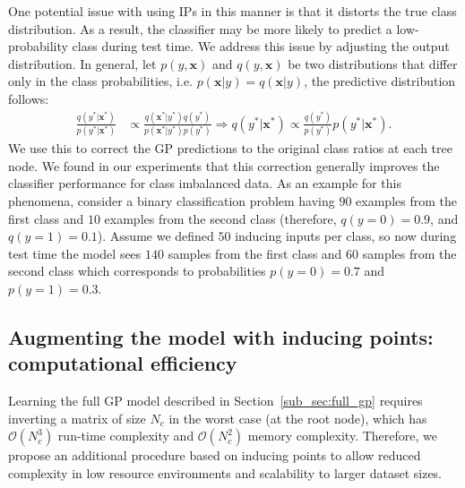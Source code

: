 \documentclass{article}
\def\Secref#1{Section~\ref{#1}}
\def\rvx{{\mathbf{x}}}
\begin{document}
One potential issue with using IPs in this manner is that it distorts the true class distribution. As a result, the classifier may be more likely to predict a low-probability class during test time. 
We address this issue by adjusting the output distribution. In general, let $p( y, \rvx)$ and $q( y, \rvx)$ be two distributions that differ only in the class probabilities, i.e. $p(\rvx|y) = q(\rvx|y)$, the predictive distribution follows:
\begin{equation}\label{eq:fix_class_dist}
    \begin{aligned}
        \frac{q( y^{*} | \rvx^{*})}{p( y^{*} | \rvx^{*})} &\propto \frac{q( \rvx^{*} | y^{*}) q(y^{*})}{p( \rvx^{*} | y^{*}) p(y^{*})} \Longrightarrow
        q( y^{*} | \rvx^{*}) \propto \frac{q(y^{*})}{p(y^{*})}p( y^{*} | \rvx^{*}).
    \end{aligned}
\end{equation}
We use this to correct the GP predictions to the original class ratios at each tree node. We found in our experiments that this correction generally improves the classifier performance for class imbalanced data. As an example for this phenomena, consider a binary classification problem having $90$ examples from the first class and $10$ examples from the second class (therefore, $q(y=0) = 0.9$, and $q(y=1) = 0.1$). Assume we defined $50$ inducing inputs per class, so now during test time the model sees $140$ samples from the first class and $60$ samples from the second class which corresponds to probabilities $p(y=0)=0.7$ and $p(y=1)=0.3$.





\subsection{Augmenting the model with inducing points: computational efficiency} \label{subsec_method:gp_IP-compute}
Learning the full GP model described in \Secref{sub_sec:full_gp} requires inverting a matrix of size $N_c$ in the worst case (at the root node), which has $\mathcal{O}(N_c^3)$ run-time complexity and $\mathcal{O}(N_c^2)$ memory complexity. Therefore, we propose an additional procedure based on inducing points to allow reduced complexity in low resource environments and scalability to larger dataset sizes.
\end{document}
